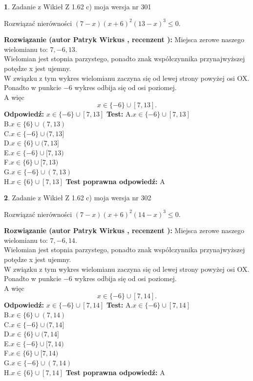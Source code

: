 \documentclass[12pt, a4paper]{article}
\theoremstyle{definition} %
\newtheorem{zad}{}
\newcommand{\zadStart}[1]{\begin{zad}#1\newline}
\newcommand{\zadStop}{\end{zad}}
\newcommand{\rozwStart}[2]{\noindent \textbf{Rozwiązanie (autor #1 , recenzent #2): }\newline}
\newcommand{\rozwStop}{\newline}
\newcommand{\odpStart}{\noindent \textbf{Odpowiedź:}\newline}
\newcommand{\odpStop}{\newline}
\newcommand{\testStart}{\noindent \textbf{Test:}\newline}
\newcommand{\testStop}{\newline}
\newcommand{\kluczStart}{\noindent \textbf{Test poprawna odpowiedź:}\newline}
\newcommand{\kluczStop}{\newline}
\begin{document}
\zadStart{Zadanie z Wikieł Z 1.62 c) moja wersja nr 301}

Rozwiązać nierówności $(7-x)(x+6)^{2}(13-x)^{3}\le0$.
\zadStop
\rozwStart{Patryk Wirkus}{}
Miejsca zerowe naszego wielomianu to: $7, -6, 13$.\\
Wielomian jest stopnia parzystego, ponadto znak współczynnika przy\linebreak najwyższej potędze x jest ujemny.\\ W związku z tym wykres wielomianu zaczyna się od lewej strony powyżej osi OX.\\
Ponadto w punkcie $-6$ wykres odbija się od osi poziomej.\\
A więc $$x \in \{-6\} \cup [7,13].$$
\rozwStop
\odpStart
$x \in \{-6\} \cup [7,13]$
\odpStop
\testStart
A.$x \in \{-6\} \cup [7,13]$\\
B.$x \in \{6\} \cup (7,13)$\\
C.$x \in \{-6\} \cup (7,13]$\\
D.$x \in \{6\} \cup (7,13]$\\
E.$x \in \{-6\} \cup [7,13)$\\
F.$x \in \{6\} \cup [7,13)$\\
G.$x \in \{-6\} \cup (7,13)$\\
H.$x \in \{6\} \cup [7,13]$
\testStop
\kluczStart
A
\kluczStop



\zadStart{Zadanie z Wikieł Z 1.62 c) moja wersja nr 302}

Rozwiązać nierówności $(7-x)(x+6)^{2}(14-x)^{3}\le0$.
\zadStop
\rozwStart{Patryk Wirkus}{}
Miejsca zerowe naszego wielomianu to: $7, -6, 14$.\\
Wielomian jest stopnia parzystego, ponadto znak współczynnika przy\linebreak najwyższej potędze x jest ujemny.\\ W związku z tym wykres wielomianu zaczyna się od lewej strony powyżej osi OX.\\
Ponadto w punkcie $-6$ wykres odbija się od osi poziomej.\\
A więc $$x \in \{-6\} \cup [7,14].$$
\rozwStop
\odpStart
$x \in \{-6\} \cup [7,14]$
\odpStop
\testStart
A.$x \in \{-6\} \cup [7,14]$\\
B.$x \in \{6\} \cup (7,14)$\\
C.$x \in \{-6\} \cup (7,14]$\\
D.$x \in \{6\} \cup (7,14]$\\
E.$x \in \{-6\} \cup [7,14)$\\
F.$x \in \{6\} \cup [7,14)$\\
G.$x \in \{-6\} \cup (7,14)$\\
H.$x \in \{6\} \cup [7,14]$
\testStop
\kluczStart
A
\kluczStop
\end{document}
